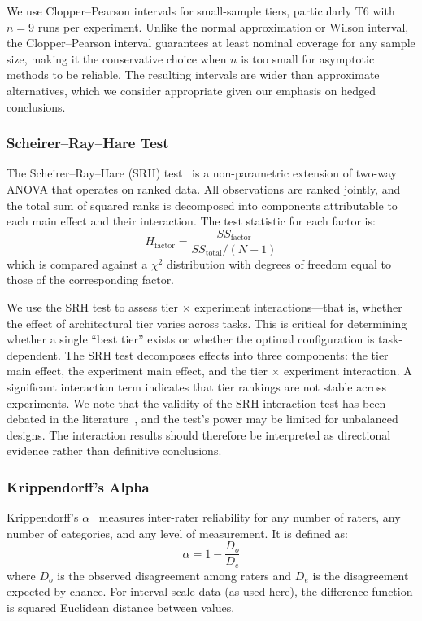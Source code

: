\documentclass[11pt]{article}
\begin{document}
We use Clopper--Pearson intervals for small-sample tiers, particularly T6 with
$n = 9$ runs per experiment. Unlike the normal approximation or Wilson interval,
the Clopper--Pearson interval guarantees at least nominal coverage for any
sample size, making it the conservative choice when $n$ is too small for
asymptotic methods to be reliable. The resulting intervals are wider than
approximate alternatives, which we consider appropriate given our emphasis on
hedged conclusions.

\subsubsection{Scheirer--Ray--Hare Test}
\label{sec:srh_test}

The Scheirer--Ray--Hare (SRH) test~\cite{scheirer1976analysis} is a
non-parametric extension of two-way ANOVA that operates on ranked data. All
observations are ranked jointly, and the total sum of squared ranks is
decomposed into components attributable to each main effect and their
interaction. The test statistic for each factor is:
\begin{equation}
  H_{\text{factor}} = \frac{SS_{\text{factor}}}{SS_{\text{total}} / (N-1)}
\end{equation}
which is compared against a $\chi^2$ distribution with degrees of freedom
equal to those of the corresponding factor.

We use the SRH test to assess tier $\times$ experiment interactions---that is,
whether the effect of architectural tier varies across tasks. This is critical
for determining whether a single ``best tier'' exists or whether the optimal
configuration is task-dependent. The SRH test decomposes effects into three
components: the tier main effect, the experiment main effect, and the
tier $\times$ experiment interaction. A significant interaction term indicates
that tier rankings are not stable across experiments. We note that the
validity of the SRH interaction test has been debated in the
literature~\cite{scheirer1976analysis}, and the test's power may be limited
for unbalanced designs. The interaction results should therefore be
interpreted as directional evidence rather than definitive conclusions.

\subsubsection{Krippendorff's Alpha}
\label{sec:krippendorffs_alpha}

Krippendorff's $\alpha$~\cite{krippendorff2004content} measures inter-rater
reliability for any number of raters, any number of categories, and any level
of measurement. It is defined as:
\begin{equation}
  \alpha = 1 - \frac{D_o}{D_e}
\end{equation}
where $D_o$ is the observed disagreement among raters and $D_e$ is the
disagreement expected by chance. For interval-scale data (as used here), the
difference function is squared Euclidean distance between values.
\end{document}
